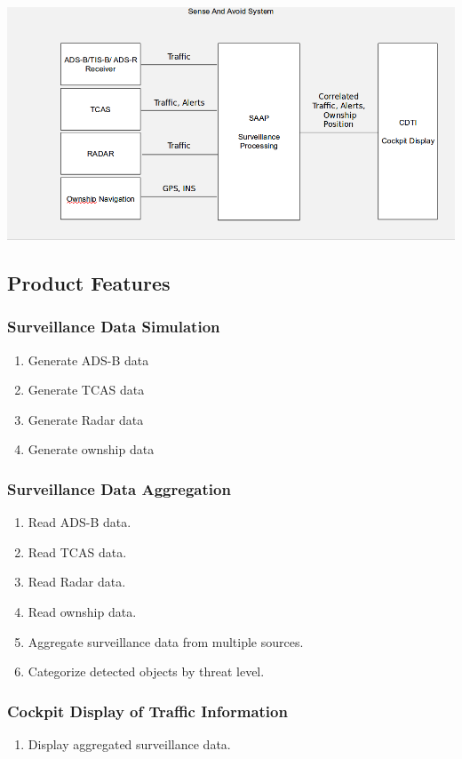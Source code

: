 \documentclass[12pt,oneside,letterpaper]{article}
\begin{document}
\includegraphics[scale=0.40]{system.png}\\

\subsection{Product Features}

\subsubsection{Surveillance Data Simulation}
\begin{enumerate}
\item Generate ADS-B data
\item Generate TCAS data
\item Generate Radar data
\item Generate ownship data
\end{enumerate}

\subsubsection{Surveillance Data Aggregation}
\begin{enumerate}
\item Read ADS-B data.
\item Read TCAS data.
\item Read Radar data.
\item Read ownship data.
\item Aggregate surveillance data from multiple sources.
\item Categorize detected objects by threat level.
\end{enumerate}

\subsubsection{Cockpit Display of Traffic Information}
\begin{enumerate}
\item Display aggregated surveillance data.
\end{enumerate}
\end{document}
